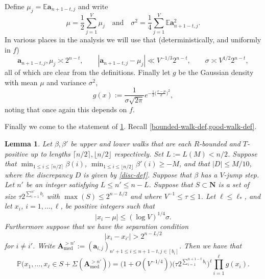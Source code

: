 \documentclass[11pt,reqno]{amsart}
\numberwithin{equation}{section}
\newtheorem{lemma}[theorem]{Lemma}
\theoremstyle{definition}
\theoremstyle{remark}
\newcommand{\mb}{\mathbb}
\newcommand{\mbf}{\mathbf}
\renewcommand{\le}{\leqslant}
\renewcommand{\ge}{\geqslant}
\def\med{\operatorname{med}}
\begin{document}
Define $\mu_j = \mb{E} \mbf{a}_{n + 1 - t,j}$ and write
\begin{equation}\label{mu-sig-def} \mu = \frac{1}{2}\sum_{j = 1}^V \mu_j \quad \mbox{and} \quad  \sigma^2 = \frac{1}{4}\sum_{j = 1}^V \mb{E} \mbf{a}_{n + 1 - t,j}^2.\end{equation}
In various places in the analysis we will use that (deterministically, and uniformly in $f$)
\begin{equation}\label{basic-a-bds} \mbf{a}_{n + 1 - t,j} , \mu_j \asymp 2^{n - t}, \qquad |\mbf{a}_{n + 1 - t,j} - \mu_j| \ll V^{-1/3} 2^{n - t}, \qquad \sigma \asymp V^{1/2} 2^{n - t},\end{equation} all of which are clear from the definitions. Finally let $g$ be the Gaussian density with mean $\mu$ and variance $\sigma^2$,
\begin{equation}\label{gaussian-def} g(x) := \frac{1}{\sigma \sqrt{2 \pi}} e^{-\frac{1}{2}\big( \frac{x - \mu}{\sigma}\big)^2},\end{equation} noting that once again this depends on $f$. 

Finally we come to the statement of \cref{lem:Poisson}. Recall \cref{bounded-walk-def,good-walk-def}.

\begin{lemma}\label{lem:Poisson} Let $\beta, \beta'$ be upper and lower walks that are each $R$-bounded and $T$-positive up to lengths $\lceil n/2\rceil, \lfloor n/2\rfloor$ respectively. Set $L := L(M) < n/2$. Suppose that $\min_{1 \le i \le \lceil n/2\rceil} \beta(i)$, $\min_{1 \le i \le \lfloor n/2\rfloor} \beta'(i) \ge - M$, and that $|D| \le M/10$, where the discrepancy $D$ is given by \cref{disc-def}.
Suppose that $\beta$ has a $V$-jump step. Let $n'$ be an integer satisfying $L \le n' \le n - L$. Suppose that $S \subset \mbf{N}$ is a set of size $\tau 2^{\sum_{i=1}^{n'} b_{i}}$ with $\max(S) \le 2^{n - L/2}$ and where $V^{-1} \le \tau \le 1$. Let $\ell \le \ell_*$, and let $x_i$, $i = 1,\dots, \ell$, be positive integers such that 
\begin{equation}\label{xi-assump} |x_i - \mu|\le (\log V)^{1/4} \sigma.\end{equation} Furthermore suppose that we have the separation condition \begin{equation}\label{lem:Poisson:sep} |x_i-x_{i'}| > 2^{n - L/2} \end{equation} for $i \ne i'$. Write $\mbf{A}_{\med}^{> n'} := (\mbf{a}_{i,j})_{n'+1 \le i \le n + 1 - t, j \in [b_i]}$. Then we have that 
\begin{equation}\label{lem31-main} \mb{P} \big(x_1,\dots, x_{\ell} \in S + \Sigma(\mbf{A}^{> n'}_{\med}) \big) =\big(1 + O( V^{-1/4})\big) \Big( \tau 2^{\sum_{i =1}^{n+1 - t} b_i}\Big)^{\ell} \prod_{i = 1}^{\ell} g(x_i).\end{equation}
\end{lemma}
\end{document}
